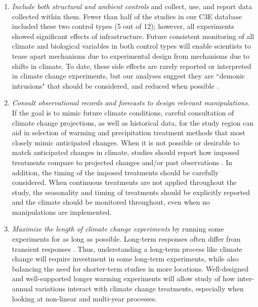 \documentclass{article}
\begin{document}
\begin{enumerate}
\item\textit{Include both structural and ambient controls} and collect, use, and report data collected within them. Fewer than half of the studies in our C3E database included these two control types (5 out of 12); however, all experiments showed significant effects of infrastructure. Future consistent monitoring of all climate and biological variables in both control types will enable scientists to tease apart mechanisms due to experimental design from mechanisms due to shifts in climate. To date, these side effects are rarely reported or interpreted in climate change experiments, but our analyses suggest they are ``demonic intrusions" that should be considered, and reduced when possible \citep{hurlbert1984}. 
\item\textit{Consult observational records and forecasts to design relevant manipulations}. If the goal is to mimic future climate conditions, careful consultation of climate change projections, as well as historical data, for the study region can aid in selection of warming and precipitation treatment methods that most closely mimic anticipated changes. When it is not possible or desirable to match anticipated changes in climate, studies should report how imposed treatments compare to projected changes and/or past observations \citep[see, e.g.,][]{hoover2014}. In addition, the timing of the imposed treatments should be carefully considered. When continuous treatments are not applied throughout the study, the seasonality and timing of treatments should be explicitly reported and the climate should be monitored throughout, even when no manipulations are implemented.
\item\textit{Maximize the length of climate change experiments} by running some experiments for as long as possible. Long-term responses often differ from transient responses  \citep{saleska2002,franklin1989,giasson2013,harte2015}. Thus, understanding a long-term process like climate change will require investment in some long-term experiments, while also balancing the need for shorter-term studies in more locations. Well-designed and well-supported longer warming experiments will allow study of how inter-annual variations interact with climate change treatments, especially when looking at non-linear and multi-year processes. 
\end{enumerate}

\clearpage
\end{document}
